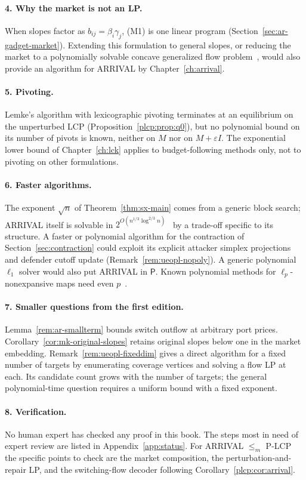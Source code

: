 \paragraph{4. Why the market is not an LP.} When slopes factor as $b_{ij}=\beta_i\gamma_j$, (M1) is one
linear program (Section~\ref{sec:ar-gadget-market}). Extending this
formulation to general slopes, or reducing the market to a
polynomially solvable concave generalized flow problem~\cite{vegh14},
would also provide an algorithm for ARRIVAL by Chapter~\ref{ch:arrival}.

\paragraph{5. Pivoting.} Lemke's algorithm with lexicographic pivoting terminates at an equilibrium on
the unperturbed LCP (Proposition~\ref{plcp:prop:q0}), but no polynomial bound on its number of pivots is
known, neither on $M$ nor on $M+\varepsilon I$. The exponential lower bound of Chapter~\ref{ch:lck}
applies to budget-following methods only, not to pivoting on other formulations.

\paragraph{6. Faster algorithms.} The exponent $\sqrt n$ of Theorem~\ref{thm:sx-main} comes from a generic
block search; ARRIVAL itself is solvable in $2^{O(n^{1/3}\log^{2/3}n)}$~\cite{glm26} by a trade-off
specific to its structure. A faster or polynomial algorithm for the contraction of
Section~\ref{sec:contraction} could exploit its explicit attacker
simplex projections and defender cutoff update (Remark~\ref{rem:ueopl-nopoly}).
A generic polynomial $\ell_1$ solver would also put ARRIVAL in $\mathsf P$. Known polynomial methods for
$\ell_p$-nonexpansive maps need even $p$~\cite{dfz26}.

\paragraph{7. Smaller questions from the first edition.}
Lemma~\ref{rem:ar-smallterm} bounds switch outflow at arbitrary port
prices. Corollary~\ref{cor:mk-original-slopes} retains original slopes
below one in the market embedding. Remark~\ref{rem:ueopl-fixeddim} gives
a direct algorithm for a fixed number of targets by enumerating coverage
vertices and solving a flow LP at each. Its candidate count grows with
the number of targets; the general polynomial-time question requires
a uniform bound with a fixed exponent.

\paragraph{8. Verification.} No human expert has checked any proof in this book. The steps most in need
of expert review are listed in Appendix~\ref{app:status}. For ARRIVAL
$\le_m$ P-LCP the specific points to check are the market composition,
the perturbation-and-repair LP, and the switching-flow decoder following
Corollary~\ref{plcp:cor:arrival}.
